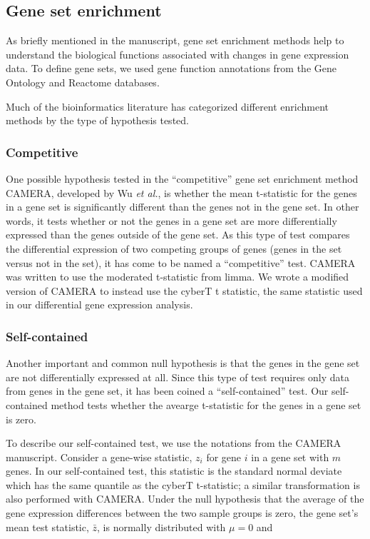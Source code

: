 \subsection{Gene set enrichment}

As briefly mentioned in the manuscript, gene set enrichment methods help to 
understand the biological functions associated with changes in gene expression
data. To define gene sets, we used gene function annotations from the Gene 
Ontology and Reactome databases.

Much of the bioinformatics literature has categorized
different enrichment methods by the type of hypothesis tested.\autocite{Ackermann2009}

\subsubsection{Competitive}

One possible hypothesis tested in the ``competitive'' gene set enrichment method
CAMERA, developed by Wu \emph{et al.}, is whether the mean t-statistic for the 
genes in a gene set is significantly different than the genes not in the 
gene set.\autocite{Wu2012} In other words, it tests whether or not the genes in a gene set are 
more differentially expressed than the genes outside of the gene set. As 
this type of test compares the differential expression of two competing 
groups of genes (genes in the set versus not in the set), it has come to 
be named a ``competitive'' test. CAMERA was written to use the moderated t-statistic 
from limma.\autocite{Smyth2005} We wrote a modified version of CAMERA to instead use
the cyberT t statistic\autocite{Baldi2001}, the same statistic used in our differential gene
expression analysis.

\subsubsection{Self-contained}

Another important and common null hypothesis is that the genes in the gene set are 
not differentially expressed at all. Since this type of test requires only data 
from genes in the gene set, it has been coined a ``self-contained'' test. 
Our self-contained method tests whether the avearge t-statistic for the genes 
in a gene set is zero.

To describe our self-contained test, we use the 
notations from the CAMERA manuscript.\autocite{Wu2012} Consider a gene-wise statistic, $z_i$ for gene $i$ in
a gene set with $m$ genes. In our self-contained test, this statistic is the 
standard normal deviate which has the
same quantile as the cyberT t-statistic; a similar transformation is also 
performed with CAMERA. Under the null hypothesis that
the average of the gene expression differences between the two sample groups is zero, 
the gene set's mean test statistic, $\bar{z}$, is normally distributed with
$\mu{}=0$ and

